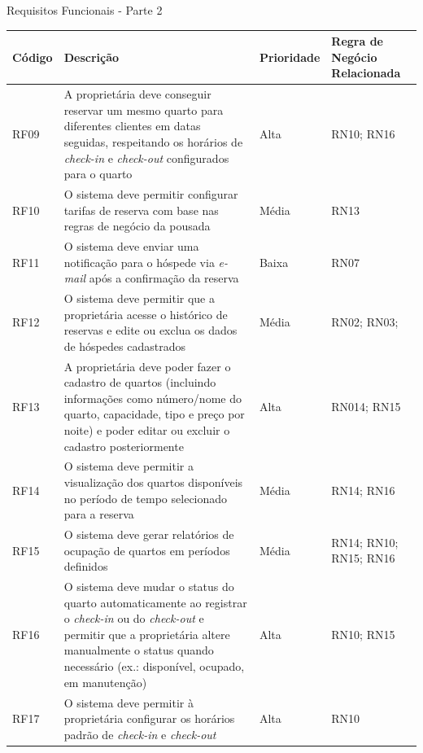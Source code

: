 \documentclass[
	12pt,				%
	openany,			%
	oneside,			%
	a4paper,			%
	english,			%
	french,				%
	spanish,			%
	brazil				%
	]{abntex2}
\begin{document}
\begin{quadro}[H]
	\caption{Requisitos Funcionais - Parte 2}
	\label{quadro_rf2}
	\begin{tabular}{|>{\centering\arraybackslash}p{1.5cm}|p{6.7cm}|>{\centering\arraybackslash}p{2cm}|>{\centering\arraybackslash}p{4cm}|}
		\hline
		\textbf{Código} & \textbf{Descrição} & \textbf{Prioridade} & \textbf{Regra de Negócio Relacionada} 
		\\ \hline
		RF09 & A proprietária deve conseguir reservar um mesmo quarto para diferentes clientes em datas seguidas, respeitando os horários de \textit{check-in} e \textit{check-out} configurados para o quarto & Alta & RN10; RN16
		\\ \hline
		RF10 & O sistema deve permitir configurar tarifas de reserva com base nas regras de negócio da pousada & Média & RN13
		 \\ \hline
		RF11 & O sistema deve enviar uma notificação para o hóspede via \textit{e-mail} após a confirmação da reserva & Baixa & RN07
		 \\ \hline
		RF12 & O sistema deve permitir que a proprietária acesse o histórico de reservas e edite ou exclua os dados de hóspedes cadastrados & Média & RN02; RN03; 
		\\ \hline 
		RF13 & A proprietária deve poder fazer o cadastro de quartos (incluindo informações como número/nome do quarto, capacidade, tipo e preço por noite) e poder editar ou excluir o cadastro posteriormente & Alta & RN014; RN15
		\\ \hline
		RF14 & O sistema deve permitir a visualização dos quartos disponíveis no período de tempo selecionado para a reserva & Média & RN14; RN16 
		\\ \hline
		RF15 & O sistema deve gerar relatórios de ocupação de quartos em períodos definidos & Média & RN14; RN10; RN15; RN16
		 \\ \hline
		RF16 & O sistema deve mudar o status do quarto automaticamente ao registrar o \textit{check-in} ou do \textit{check-out} e permitir que a proprietária altere manualmente o status quando necessário (ex.: disponível, ocupado, em manutenção)  & Alta & RN10; RN15 
		\\ \hline
		RF17 & O sistema deve permitir à proprietária configurar os horários padrão de \textit{check-in} e \textit{check-out} & Alta & RN10
		\\ \hline
	\end{tabular}
\end{quadro}
\end{document}
